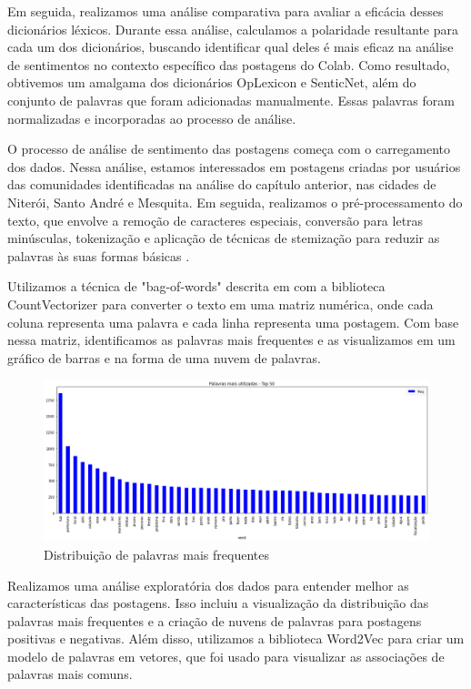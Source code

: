 Em seguida, realizamos uma análise comparativa para avaliar a eficácia desses dicionários léxicos. Durante essa análise, calculamos a polaridade resultante para cada um dos dicionários, buscando identificar qual deles é mais eficaz na análise de sentimentos no contexto específico das postagens do Colab. Como resultado, obtivemos um amalgama dos dicionários OpLexicon e SenticNet, além do conjunto de palavras que foram adicionadas manualmente. Essas palavras foram normalizadas e incorporadas ao processo de análise.

O processo de análise de sentimento das postagens começa com o carregamento dos dados. Nessa análise, estamos interessados em postagens criadas por usuários das comunidades identificadas na análise do capítulo anterior, nas cidades de Niterói, Santo André e Mesquita. Em seguida, realizamos o pré-processamento do texto, que envolve a remoção de caracteres especiais, conversão para letras minúsculas, tokenização e aplicação de técnicas de stemização para reduzir as palavras às suas formas básicas \cite[]{2009_Bird_BOOK}.

Utilizamos a técnica de "bag-of-words" descrita em  com a biblioteca CountVectorizer para converter o texto em uma matriz numérica, onde cada coluna representa uma palavra e cada linha representa uma postagem. Com base nessa matriz, identificamos as palavras mais frequentes e as visualizamos em um gráfico de barras e na forma de uma nuvem de palavras.

\begin{figure}[!htb]
	\caption{Distribuição de palavras mais frequentes}
	\label{fig:wordcount}
	\centering
	\includegraphics[scale=0.35]{images/wordcount.png}
	\fautor
\end{figure}

Realizamos uma análise exploratória dos dados para entender melhor as características das postagens. Isso incluiu a visualização da distribuição das palavras mais frequentes e a criação de nuvens de palavras para postagens positivas e negativas. Além disso, utilizamos a biblioteca Word2Vec para criar um modelo de palavras em vetores, que foi usado para visualizar as associações de palavras mais comuns.

